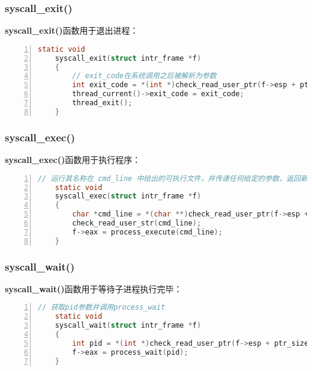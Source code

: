 \documentclass{article}
\begin{document}
	\subsubsection{syscall\_exit()}
	
	\textbf{syscall\_exit()}函数用于退出进程：
	
	\begin{lstlisting}[xleftmargin = 4em,xrightmargin = 4em, aboveskip = 1em, numbers = left, language = C,title=src/userprog/syscall.c - \texttt{syscall\_exit()}]
    static void
    syscall_exit(struct intr_frame *f)
    {
    	// exit_code在系统调用之后被解析为参数
    	int exit_code = *(int *)check_read_user_ptr(f->esp + ptr_size, sizeof(int));
    	thread_current()->exit_code = exit_code;
    	thread_exit();
    }
	\end{lstlisting}
	
	\subsubsection{syscall\_exec()}
	
	\textbf{syscall\_exec()}函数用于执行程序：
	
	\begin{lstlisting}[xleftmargin = 4em,xrightmargin = 4em, aboveskip = 1em, numbers = left, language = C,title=src/userprog/syscall.c - \texttt{syscall\_exec()}]
    // 运行其名称在 cmd_line 中给出的可执行文件，并传递任何给定的参数，返回新进程的进程ID(pid)
    static void
    syscall_exec(struct intr_frame *f)
    {
    	char *cmd_line = *(char **)check_read_user_ptr(f->esp + ptr_size, ptr_size);
    	check_read_user_str(cmd_line);
    	f->eax = process_execute(cmd_line);
    }
	\end{lstlisting}
	
	\subsubsection{syscall\_wait()}
	
	\textbf{syscall\_wait()}函数用于等待子进程执行完毕：
	
	\begin{lstlisting}[xleftmargin = 4em,xrightmargin = 4em, aboveskip = 1em, numbers = left, language = C,title=src/userprog/syscall.c - \texttt{syscall\_wait()}]
    // 获取pid参数并调用process_wait
    static void
    syscall_wait(struct intr_frame *f)
    {
    	int pid = *(int *)check_read_user_ptr(f->esp + ptr_size, sizeof(int));
    	f->eax = process_wait(pid);
    }
	\end{lstlisting}
	
\end{document}
